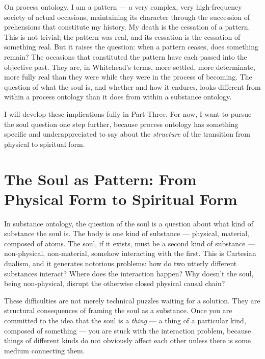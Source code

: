 On process ontology, I am a pattern --- a very complex, very high-frequency
society of actual occasions, maintaining its character through the succession
of prehensions that constitute my history.
My death is the cessation of a pattern.
This is not trivial; the pattern was real, and its cessation is the cessation
of something real.
But it raises the question: when a pattern ceases, does something remain?
The occasions that constituted the pattern have each passed into the
objective past.
They are, in Whitehead's terms, more settled, more determinate,
more fully real than they were while they were in the process of becoming.
The question of what the soul is, and whether and how it endures,
looks different from within a process ontology than it does from within
a substance ontology.

I will develop these implications fully in Part Three.
For now, I want to pursue the soul question one step further, because process
ontology has something specific and underappreciated to say about the
\emph{structure} of the transition from physical to spiritual form.

\section{The Soul as Pattern: From Physical Form to Spiritual Form}
\label{sec:ch4-soul-as-pattern}

In substance ontology, the question of the soul is a question about what
kind of substance the soul is.
The body is one kind of substance --- physical, material, composed of atoms.
The soul, if it exists, must be a second kind of substance --- non-physical,
non-material, somehow interacting with the first.
This is Cartesian dualism, and it generates notorious problems: how do two
utterly different substances interact?
Where does the interaction happen?
Why doesn't the soul, being non-physical, disrupt the otherwise closed
physical causal chain?

These difficulties are not merely technical puzzles waiting for a solution.
They are structural consequences of framing the soul as a substance.
Once you are committed to the idea that the soul is a \emph{thing} ---
a thing of a particular kind, composed of something --- you are stuck with
the interaction problem, because things of different kinds do not obviously
affect each other unless there is some medium connecting them.

